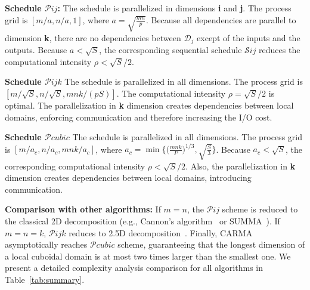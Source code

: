 \documentclass[sigplan,review,anonymous,10pt]{acmart}\settopmatter{printfolios=true,printccs=false,printacmref=false}
\newcommand\mac[1]{\textcolor{red}{[Mac: #1]}}
\newcommand{\macb}[1]{\textbf{\textsf{#1}}}
\begin{document}

\macb{Schedule $\mathcal{P}ij$:} 
%
The schedule is parallelized in dimensions \textbf{i} and \textbf{j}. The
process grid is $[m/a , n/a, 1]$, where $a = \sqrt{\frac{mn}{p}}$.  Because all
dependencies are parallel to dimension \textbf{k}, there are no dependencies
between $\mathcal{D}_j$ except of the inputs and the outputs.  Because $a <
\sqrt{S}$, the corresponding sequential schedule $\mathcal{S}ij$ reduces the
computational intensity $\rho < \sqrt{S}/2$.

\macb{Schedule $\mathcal{P}ijk$}
%
The schedule is parallelized in all dimensions. The process grid is
$[m/\sqrt{S} , n/\sqrt{S}, mnk/(pS)]$.  The
computational intensity $\rho = \sqrt{S}/2$ is optimal. The parallelization in
\textbf{k} dimension creates dependencies between local domains, enforcing
communication and therefore increasing the I/O cost.

\macb{Schedule $\mathcal{P}cubic$} 
%
The schedule is parallelized in all dimensions. The process grid is $[m/a_c ,
n/a_c, mnk/a_c]$, where $a_c = \min\Big\{\big(\frac{mnk}{P}\big)^{1/3},
\sqrt{\frac{S}{3}}\Big\}$. Because $a_c < \sqrt{S}$, the corresponding
computational intensity $\rho < \sqrt{S}/2$.  Also,  the parallelization in
\textbf{k} dimension creates dependencies between local domains, introducing 
communication. 

\macb{Comparison with other algorithms: 
}
%
If $m = n$, the $\mathcal{P}ij$ scheme is reduced to the classical 2D
decomposition (e.g., Cannon's algorithm~\cite{Cannon} or SUMMA~\cite{summa}).
If $m = n = k$, $\mathcal{P}ijk$ reduces to 2.5D decomposition~\cite{25d}.
Finally, CARMA~\cite{CARMA} asymptotically reaches $\mathcal{P}cubic$ scheme,
guaranteeing that the longest dimension of a local cuboidal domain is at most
two times larger than the smallest one. We present a detailed complexity 
analysis comparison for all algorithms in Table~\ref{tab:summary}.
\end{document}
